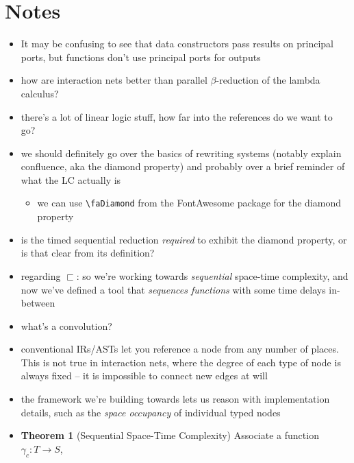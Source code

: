 \documentclass{fit-teorsem}
\begin{document}
\maketsheader
\thispagestyle{empty}

\section*{Notes}
\begin{itemize}
	\item It may be confusing to see that data constructors pass results on
		principal ports, but functions don't use principal ports for outputs
	\item how are interaction nets better than parallel $\beta$-reduction of
		the lambda calculus?
	\item there's a lot of linear logic stuff, how far into the references
		do we want to go?
	\item we should definitely go over the basics of rewriting systems
		(notably explain confluence, aka the diamond property) and
		probably over a brief reminder of what the LC actually is
		\begin{itemize}
			\item we can use \verb|\faDiamond| from the FontAwesome package
				for the diamond property
		\end{itemize}
	\item is the timed sequential reduction \textit{required} to exhibit
		the diamond property, or is that clear from its definition?
	\item regarding $\sqsubset$: so we're working towards \textit{sequential}
		space-time complexity, and now we've defined a tool that
		\textit{sequences functions} with some time delays in-between
	\item what's a convolution?
	\item conventional IRs/ASTs let you reference a node from any number of places.
		This is not true in interaction nets, where the degree of each type of node
		is always fixed -- it is impossible to connect new edges at will
	\item the framework we're building towards lets us reason with implementation
		details, such as the \textit{space occupancy} of individual typed nodes
	\item \textbf{Theorem 1} (Sequential Space-Time Complexity) Associate a function $\gamma_c : T \to S$,

\end{itemize}
\end{document}
